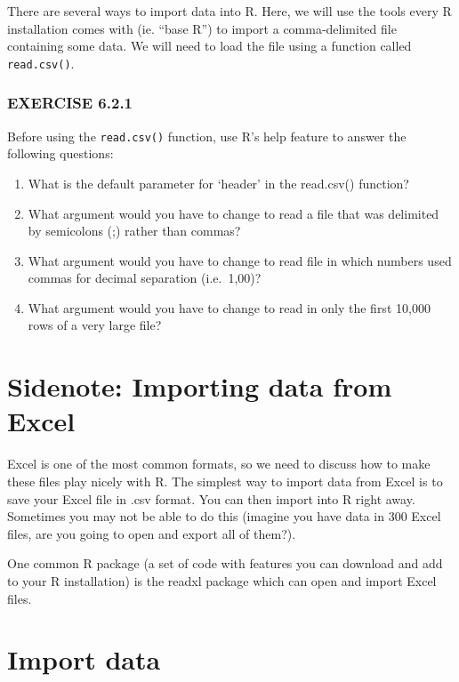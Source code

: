 \documentclass[
]{book}
\providecommand{\tightlist}{%
  \setlength{\itemsep}{0pt}\setlength{\parskip}{0pt}}
\begin{document}
There are several ways to import data into R. Here, we will use the tools every R installation comes with (ie. ``base R'') to import a comma-delimited file containing some data. We will need to load the file using a function called \texttt{read.csv()}.

\hypertarget{exercise-6.2.1}{%
\subsubsection*{EXERCISE 6.2.1}\label{exercise-6.2.1}}

Before using the \texttt{read.csv()} function, use R's help feature to answer the following questions:

\begin{enumerate}
\def\labelenumi{\arabic{enumi}.}
\tightlist
\item
  What is the default parameter for `header' in the read.csv() function?
\item
  What argument would you have to change to read a file that was delimited by semicolons (;) rather than commas?
\item
  What argument would you have to change to read file in which numbers used commas for decimal separation (i.e.~1,00)?
\item
  What argument would you have to change to read in only the first 10,000 rows of a very large file?
\end{enumerate}

\hypertarget{sidenote-importing-data-from-excel}{%
\section{Sidenote: Importing data from Excel}\label{sidenote-importing-data-from-excel}}

Excel is one of the most common formats, so we need to discuss how to make these files play nicely with R. The simplest way to import data from Excel is to save your Excel file in .csv format. You can then import into R right away. Sometimes you may not be able to do this (imagine you have data in 300 Excel files, are you going to open and export all of them?).

One common R package (a set of code with features you can download and add to your R installation) is the readxl package which can open and import Excel files.

\hypertarget{import-data}{%
\section{Import data}\label{import-data}}
\end{document}
